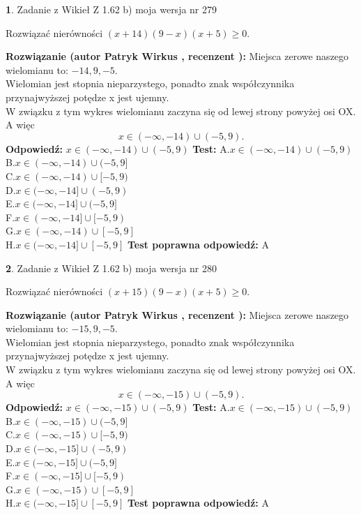 \documentclass[12pt, a4paper]{article}
\theoremstyle{definition} %
\newtheorem{zad}{}
\newcommand{\zadStart}[1]{\begin{zad}#1\newline}
\newcommand{\zadStop}{\end{zad}}
\newcommand{\rozwStart}[2]{\noindent \textbf{Rozwiązanie (autor #1 , recenzent #2): }\newline}
\newcommand{\rozwStop}{\newline}
\newcommand{\odpStart}{\noindent \textbf{Odpowiedź:}\newline}
\newcommand{\odpStop}{\newline}
\newcommand{\testStart}{\noindent \textbf{Test:}\newline}
\newcommand{\testStop}{\newline}
\newcommand{\kluczStart}{\noindent \textbf{Test poprawna odpowiedź:}\newline}
\newcommand{\kluczStop}{\newline}
\begin{document}
\zadStart{Zadanie z Wikieł Z 1.62 b) moja wersja nr 279}

Rozwiązać nierówności $(x+14)(9-x)(x+5)\ge0$.
\zadStop
\rozwStart{Patryk Wirkus}{}
Miejsca zerowe naszego wielomianu to: $-14, 9, -5$.\\
Wielomian jest stopnia nieparzystego, ponadto znak współczynnika przy\linebreak najwyższej potędze x jest ujemny.\\ W związku z tym wykres wielomianu zaczyna się od lewej strony powyżej osi OX. A więc $$x \in (-\infty,-14) \cup (-5,9).$$
\rozwStop
\odpStart
$x \in (-\infty,-14) \cup (-5,9)$
\odpStop
\testStart
A.$x \in (-\infty,-14) \cup (-5,9)$\\
B.$x \in (-\infty,-14) \cup (-5,9]$\\
C.$x \in (-\infty,-14) \cup [-5,9)$\\
D.$x \in (-\infty,-14] \cup (-5,9)$\\
E.$x \in (-\infty,-14] \cup (-5,9]$\\
F.$x \in (-\infty,-14] \cup [-5,9)$\\
G.$x \in (-\infty,-14) \cup [-5,9]$\\
H.$x \in (-\infty,-14] \cup [-5,9]$
\testStop
\kluczStart
A
\kluczStop



\zadStart{Zadanie z Wikieł Z 1.62 b) moja wersja nr 280}

Rozwiązać nierówności $(x+15)(9-x)(x+5)\ge0$.
\zadStop
\rozwStart{Patryk Wirkus}{}
Miejsca zerowe naszego wielomianu to: $-15, 9, -5$.\\
Wielomian jest stopnia nieparzystego, ponadto znak współczynnika przy\linebreak najwyższej potędze x jest ujemny.\\ W związku z tym wykres wielomianu zaczyna się od lewej strony powyżej osi OX. A więc $$x \in (-\infty,-15) \cup (-5,9).$$
\rozwStop
\odpStart
$x \in (-\infty,-15) \cup (-5,9)$
\odpStop
\testStart
A.$x \in (-\infty,-15) \cup (-5,9)$\\
B.$x \in (-\infty,-15) \cup (-5,9]$\\
C.$x \in (-\infty,-15) \cup [-5,9)$\\
D.$x \in (-\infty,-15] \cup (-5,9)$\\
E.$x \in (-\infty,-15] \cup (-5,9]$\\
F.$x \in (-\infty,-15] \cup [-5,9)$\\
G.$x \in (-\infty,-15) \cup [-5,9]$\\
H.$x \in (-\infty,-15] \cup [-5,9]$
\testStop
\kluczStart
A
\kluczStop
\end{document}
